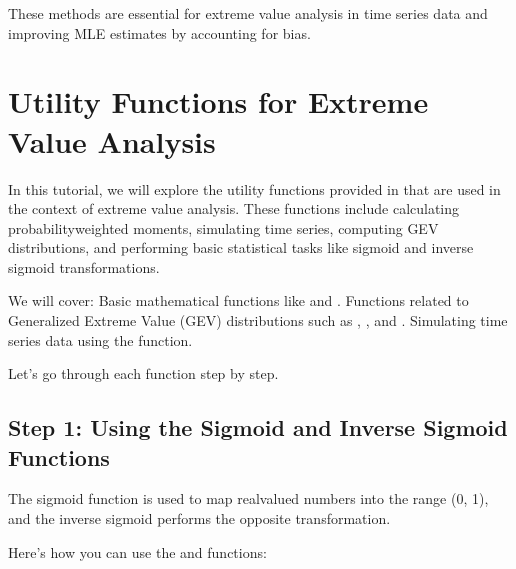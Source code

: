 \documentclass[a4paper,11pt,openany,english]{sphinxmanual}
\begin{document}
\sphinxAtStartPar
These methods are essential for extreme value analysis in time series data and improving MLE estimates by accounting for bias.

\sphinxstepscope


\chapter{Utility Functions for Extreme Value Analysis}
\label{\detokenize{miscellaneous:utility-functions-for-extreme-value-analysis}}\label{\detokenize{miscellaneous::doc}}
\sphinxAtStartPar
In this tutorial, we will explore the utility functions provided in  that are used in the context of extreme value analysis. These functions include calculating probability\sphinxhyphen{}weighted moments, simulating time series, computing GEV distributions, and performing basic statistical tasks like sigmoid and inverse sigmoid transformations.

\sphinxAtStartPar
We will cover:
\sphinxhyphen{} Basic mathematical functions like  and .
\sphinxhyphen{} Functions related to Generalized Extreme Value (GEV) distributions such as , , and .
\sphinxhyphen{} Simulating time series data using the  function.

\sphinxAtStartPar
Let’s go through each function step by step.


\section{Step 1: Using the Sigmoid and Inverse Sigmoid Functions}
\label{\detokenize{miscellaneous:step-1-using-the-sigmoid-and-inverse-sigmoid-functions}}
\sphinxAtStartPar
The sigmoid function is used to map real\sphinxhyphen{}valued numbers into the range (0, 1), and the inverse sigmoid performs the opposite transformation.

\sphinxAtStartPar
Here’s how you can use the  and  functions:
\end{document}
